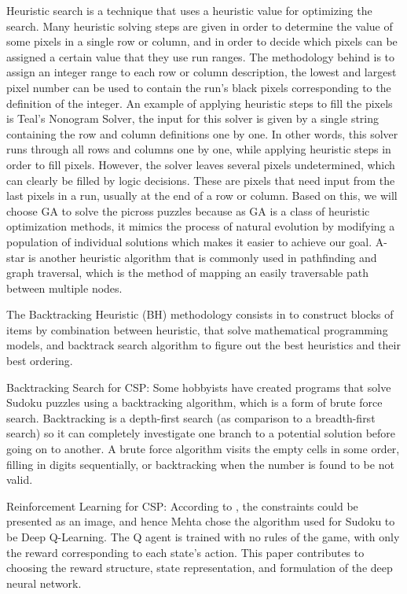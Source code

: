 \documentclass{svproc}
\begin{document}
Heuristic search is a technique that uses a heuristic value for optimizing the search. Many heuristic solving steps are given in order to determine the value of some pixels in a single row or column\cite{Salcedo}, and in order to decide which pixels can be assigned a certain value that they use run ranges\cite{CHYU}. The methodology behind is to assign an integer range to each row or column description, the lowest and largest pixel number can be used to contain the run’s black pixels corresponding to the definition of the integer. An example of applying heuristic steps to fill the pixels is Teal’s Nonogram Solver\cite{Teal}, the input for this solver is given by a single string containing the row and column definitions one by one. In other words, this solver runs through all rows and columns one by one, while applying heuristic steps in order to fill pixels. However, the solver leaves several pixels undetermined, which can clearly be filled by logic decisions. These are pixels that need input from the last pixels in a run, usually at the end of a row or column. Based on this, we will choose GA to solve the picross puzzles because as GA is a class of heuristic optimization methods, it mimics the process of natural evolution by modifying a population of individual solutions which makes it easier to achieve our goal. A-star is another heuristic algorithm that is commonly used in pathfinding and graph traversal, which is the method of mapping an easily traversable path between multiple nodes\cite{astar}. 

The Backtracking Heuristic (BH) methodology consists in to construct blocks of items by combination between heuristic, that solve mathematical programming models, and backtrack search algorithm to figure out the best heuristics and their best ordering\cite{BH}.

Backtracking Search for CSP: Some hobbyists have created programs that solve Sudoku puzzles using a backtracking algorithm, which is a form of brute force search\cite{brute}. Backtracking is a depth-first search (as comparison to a breadth-first search) so it can completely investigate one branch to a potential solution before going on to another. A brute force algorithm visits the empty cells in some order, filling in digits sequentially, or backtracking when the number is found to be not valid\cite{Peter,lecture}.

Reinforcement Learning for CSP: According to \cite{Qlearning}, the constraints could be presented as an image, and hence Mehta chose the algorithm used for Sudoku to be Deep Q-Learning. The Q agent is trained with no rules of the game, with only the reward corresponding to each state's action. This paper\cite{Qlearning} contributes to choosing the reward structure, state representation, and formulation of the deep neural network. 
\end{document}
